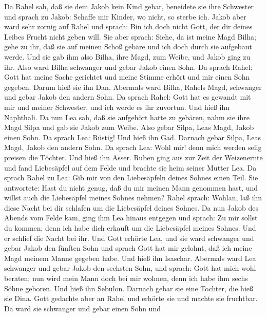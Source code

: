  Da Rahel sah, daß sie dem Jakob kein Kind gebar, beneidete
sie ihre Schwester und sprach zu Jakob: Schaffe mir Kinder, wo nicht, so
sterbe ich.  Jakob aber ward sehr zornig auf Rahel und
sprach: Bin ich doch nicht Gott, der dir deines Leibes Frucht nicht
geben will.  Sie aber sprach: Siehe, da ist meine Magd
Bilha; gehe zu ihr, daß sie auf meinen Schoß gebäre und ich doch durch
sie aufgebaut werde.  Und sie gab ihm also Bilha, ihre Magd,
zum Weibe, und Jakob ging zu ihr.  Also ward Bilha schwanger
und gebar Jakob einen Sohn.  Da sprach Rahel: Gott hat meine
Sache gerichtet und meine Stimme erhört und mir einen Sohn gegeben.
Darum hieß sie ihn Dan.  Abermals ward Bilha, Rahels Magd,
schwanger und gebar Jakob den andern Sohn.  Da sprach Rahel:
Gott hat es gewandt mit mir und meiner Schwester, und ich werde es ihr
zuvortun. Und hieß ihn Naphthali.  Da nun Lea sah, daß sie
aufgehört hatte zu gebären, nahm sie ihre Magd Silpa und gab sie Jakob
zum Weibe.  Also gebar Silpa, Leas Magd, Jakob einen Sohn.
 Da sprach Lea: Rüstig! Und hieß ihn Gad. 
Darnach gebar Silpa, Leas Magd, Jakob den andern Sohn.  Da
sprach Lea: Wohl mir! denn mich werden selig preisen die Töchter. Und
hieß ihn Asser.  Ruben ging aus zur Zeit der Weizenernte
und fand Liebesäpfel auf dem Felde und brachte sie heim seiner Mutter
Lea. Da sprach Rahel zu Lea: Gib mir von den Liebesäpfeln deines Sohnes
einen Teil.  Sie antwortete: Hast du nicht genug, daß du
mir meinen Mann genommen hast, und willst auch die Liebesäpfel meines
Sohnes nehmen? Rahel sprach: Wohlan, laß ihn diese Nacht bei dir
schlafen um die Liebesäpfel deines Sohnes.  Da nun Jakob
des Abends vom Felde kam, ging ihm Lea hinaus entgegen und sprach: Zu
mir sollst du kommen; denn ich habe dich erkauft um die Liebesäpfel
meines Sohnes. Und er schlief die Nacht bei ihr.  Und Gott
erhörte Lea, und sie ward schwanger und gebar Jakob den fünften Sohn
 und sprach Gott hat mir gelohnt, daß ich meine Magd meinem
Manne gegeben habe. Und hieß ihn Isaschar.  Abermals ward
Lea schwanger und gebar Jakob den sechsten Sohn,  und
sprach: Gott hat mich wohl beraten; nun wird mein Mann doch bei mir
wohnen, denn ich habe ihm sechs Söhne geboren. Und hieß ihn Sebulon.
 Darnach gebar sie eine Tochter, die hieß sie Dina.
 Gott gedachte aber an Rahel und erhörte sie und machte sie
fruchtbar.  Da ward sie schwanger und gebar einen Sohn und
